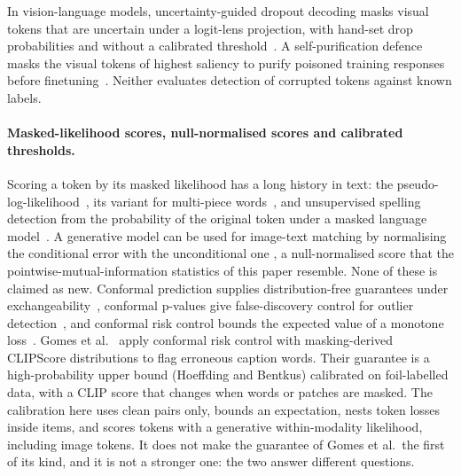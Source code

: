 In vision-language models, uncertainty-guided dropout decoding masks visual tokens that are uncertain under a
logit-lens projection, with hand-set drop probabilities and without a calibrated threshold~\cite{fang2025dropout}.
A self-purification defence masks the visual tokens of highest saliency to purify poisoned training responses before finetuning~\cite{wan2026disp}.
Neither evaluates detection of corrupted tokens against known labels.

\paragraph{Masked-likelihood scores, null-normalised scores and calibrated thresholds.}
Scoring a token by its masked likelihood has a long history in text: the pseudo-log-likelihood~\cite{salazar2020mlm}, its
variant for multi-piece words~\cite{kauf2023plwl2r}, and unsupervised spelling detection from the probability of the original
token under a masked language model~\cite{li2022uchecker}.
A generative model can be used for image-text matching by normalising the conditional error with the unconditional one
\cite{krojer2023diffusionitm}, a null-normalised score that the pointwise-mutual-information statistics of this paper
resemble.
None of these is claimed as new.
Conformal prediction supplies distribution-free guarantees under exchangeability~\cite{vovk2005algorithmic,angelopoulos2023gentle},
conformal p-values give false-discovery control for outlier detection~\cite{bates2023outliers}, and conformal risk control
bounds the expected value of a monotone loss~\cite{angelopoulos2024crc}.
Gomes et al.~\cite{gomes2025crc} apply conformal risk control with masking-derived CLIPScore distributions to flag erroneous
caption words.
Their guarantee is a high-probability upper bound (Hoeffding and Bentkus) calibrated on foil-labelled data, with a CLIP
score that changes when words or patches are masked.
The calibration here uses clean pairs only, bounds an expectation, nests token losses inside items, and scores tokens
with a generative within-modality likelihood, including image tokens.
It does not make the guarantee of Gomes et al.\ the first of its kind, and it is not a stronger one: the two answer
different questions.

